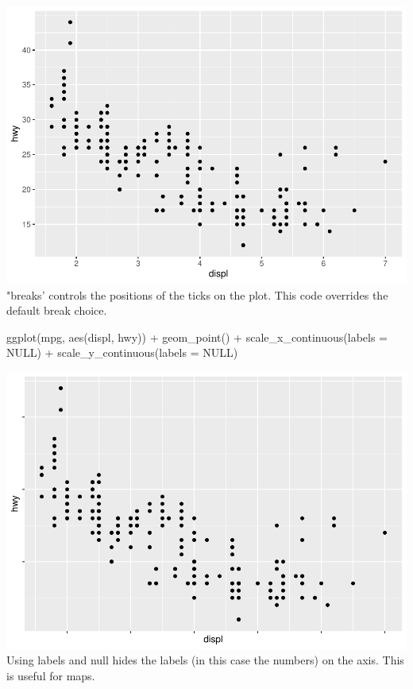 \documentclass[
]{article}
\newenvironment{Shaded}{\begin{snugshade}}{\end{snugshade}}
\newcommand{\AttributeTok}[1]{\textcolor[rgb]{0.77,0.63,0.00}{#1}}
\newcommand{\ConstantTok}[1]{\textcolor[rgb]{0.00,0.00,0.00}{#1}}
\newcommand{\FunctionTok}[1]{\textcolor[rgb]{0.00,0.00,0.00}{#1}}
\newcommand{\NormalTok}[1]{#1}
\newcommand{\SpecialCharTok}[1]{\textcolor[rgb]{0.00,0.00,0.00}{#1}}
\begin{document}
\includegraphics{Assignments_files/figure-latex/unnamed-chunk-62-1.pdf}
"breaks' controls the positions of the ticks on the plot. This code
overrides the default break choice.

\begin{Shaded}
\begin{Highlighting}[]
\FunctionTok{ggplot}\NormalTok{(mpg, }\FunctionTok{aes}\NormalTok{(displ, hwy)) }\SpecialCharTok{+}
  \FunctionTok{geom\_point}\NormalTok{() }\SpecialCharTok{+}
  \FunctionTok{scale\_x\_continuous}\NormalTok{(}\AttributeTok{labels =} \ConstantTok{NULL}\NormalTok{) }\SpecialCharTok{+}
  \FunctionTok{scale\_y\_continuous}\NormalTok{(}\AttributeTok{labels =} \ConstantTok{NULL}\NormalTok{)}
\end{Highlighting}
\end{Shaded}

\includegraphics{Assignments_files/figure-latex/unnamed-chunk-63-1.pdf}
Using labels and null hides the labels (in this case the numbers) on the
axis. This is useful for maps.
\end{document}
